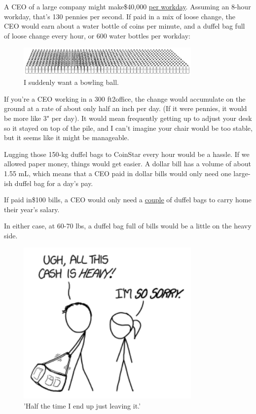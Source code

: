 {{A CEO of a large company might make\$40,000 \href{http://news.yahoo.com/median-ceo-pay-crosses-10-million-2013-104644141--finance.html}{per workday}. Assuming an 8-hour workday, that's 130 pennies per second. If paid in a mix of loose change, the CEO would earn about a water bottle of coins per minute, and a duffel bag full of loose change every hour, or 600 water bottles per workday:}

\begin{figure}[!htbp]
\centering
\includegraphics[scale=0.5, max width=0.8\textwidth]{imgs/a/118/600.png}
\caption{I suddenly want a bowling ball.}
\end{figure}

{If you're a CEO working in a 300 ft2office, the change would accumulate on the ground at a rate of about only half an inch per day. (If it were pennies, it would be more like 3" per day). It would mean frequently getting up to adjust your desk so it stayed on top of the pile, and I can't imagine your chair would be too stable, but it seems like it might be manageable.}

{Lugging those 150-kg duffel bags to CoinStar every hour would be a hassle. If we allowed paper money, things would get easier. A dollar bill has a volume of about 1.55 mL, which means that a CEO paid in dollar bills would only need one large-ish duffel bag for a day's pay.}

{If paid in\$100 bills, a CEO would only need a \href{http://xkcd.com/1070/}{couple} of duffel bags to carry home their year's salary.}

{In either case, at 60-70 lbs, a duffel bag full of bills would be a little on the heavy side.}

\begin{figure}[!htbp]
\centering
\includegraphics[scale=0.5, max width=0.8\textwidth]{imgs/a/118/heavy.png}
\caption{'Half the time I end up just leaving it.'}
\end{figure}

}
